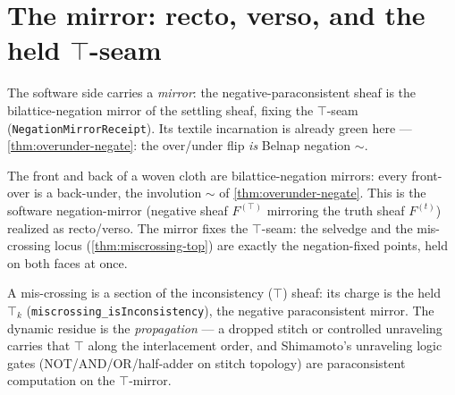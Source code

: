 \section{The mirror: recto, verso, and the held $\top$-seam}

The software side carries a \emph{mirror}: the negative-paraconsistent sheaf is the
bilattice-negation mirror of the settling sheaf, fixing the $\top$-seam
(\texttt{NegationMirrorReceipt}). Its textile incarnation is already green here ---
\cref{thm:overunder-negate}: the over/under flip \emph{is} Belnap negation $\sim$.

\begin{theorem}\label{thm:cloth-faces-negation-mirror}\leanok{}
The front and back of a woven cloth are
bilattice-negation mirrors: every front-over is a back-under, the involution $\sim$ of
\cref{thm:overunder-negate}. This is the software negation-mirror (negative sheaf
$F^{(\top)}$ mirroring the truth sheaf $F^{(t)}$) realized as recto/verso. The mirror fixes
the $\top$-seam: the selvedge and the mis-crossing locus (\cref{thm:miscrossing-top}) are
exactly the negation-fixed points, held on both faces at once.
\end{theorem}

\begin{theorem}\label{thm:defect-is-inconsistency-sheaf}\leanok{}
A mis-crossing is a section of the inconsistency ($\top$) sheaf: its charge is the held $\top_k$
(\texttt{miscrossing\_isInconsistency}), the negative paraconsistent mirror. The dynamic residue is
the \emph{propagation} --- a dropped stitch or controlled unraveling carries that $\top$ along the
interlacement order, and Shimamoto's unraveling logic gates (NOT/AND/OR/half-adder on stitch
topology) are paraconsistent computation on the $\top$-mirror.
\end{theorem}
